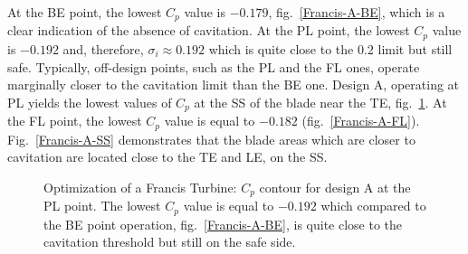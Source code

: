 At the BE point, the lowest $C_p$ value is $-0.179$, fig.\ \ref{Francis-A-BE}, which is a clear indication of the absence of cavitation.
At the PL point, the lowest $C_p$ value is $-0.192$ and, therefore, $\sigma_i \approx 0.192$ which is quite close to the $0.2$ limit but still safe. Typically, off-design points, such as the PL and the FL ones, operate marginally closer to the cavitation limit than the BE one. Design A, operating at PL yields the lowest values of $C_p$ at the SS of the blade near the TE, fig.\ \ref{Francis-A-PL}.  
At the FL point, the lowest  $C_p$ value is equal to $-0.182$ (fig.\ \ref{Francis-A-FL}). Fig.\ \ref{Francis-A-SS} demonstrates that the blade areas which are closer to cavitation are located close to the TE and LE, on the SS. 

 
\begin{figure}[h!]
\begin{minipage}[b]{1\linewidth}
 \centering
\end{minipage}
\caption{Optimization of a Francis Turbine: $C_p$ contour for design A at the PL point. The lowest $C_p$ value is equal to $-0.192$ which compared to the BE point operation, fig.\ \ref{Francis-A-BE}, is quite close to the cavitation threshold but still on the safe side.}
\label{Francis-A-PL}
\end{figure}


